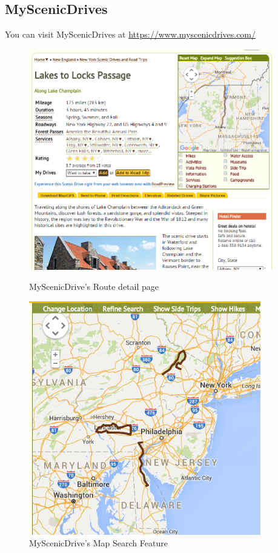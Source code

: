 \documentclass[a4paper,twoside,notitlepage,11pt]{article}
\begin{document}
\subsection{MyScenicDrives} 
You can visit MyScenicDrives at \url{https://www.myscenicdrives.com/}
\begin{figure}[!ht]
	\centering
	\begin{minipage}{.49\textwidth}
		\begin{center}
			\includegraphics[width=0.95\textwidth]{images/msd-1.png}
			\caption{MyScenicDrive's Route detail page}
		\end{center}
	\end{minipage}
	\begin{minipage}{.49\textwidth}
		\begin{center}
			\includegraphics[width=0.9\textwidth]{images/msd-2.png}
			\caption{MyScenicDrive's Map Search Feature}
		\end{center}
	\end{minipage}
\end{figure}
\end{document}
